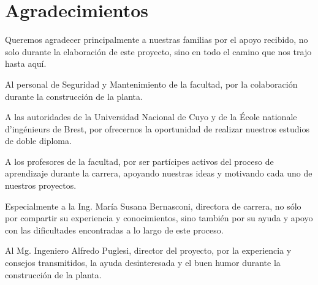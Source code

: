  \markboth{}{}
\pagestyle{empty}

\chapter*{Agradecimientos}

Queremos agradecer principalmente a nuestras familias por el apoyo recibido, no
solo durante la elaboración de este proyecto, sino en todo el camino que nos
trajo hasta aquí.

Al personal de Seguridad y Mantenimiento de la facultad, por la
colaboración durante la construcción de la planta.

A las autoridades de la Universidad Nacional de Cuyo y de la École nationale
d'ingénieurs de Brest, por ofrecernos la oportunidad de realizar nuestros
estudios de doble diploma.

A los profesores de la facultad, por ser partícipes activos del proceso de
aprendizaje durante la carrera, apoyando nuestras ideas y motivando
cada uno de nuestros proyectos.

Especialmente a la Ing. María Susana Bernasconi, directora de carrera, no sólo
por compartir su experiencia y conocimientos, sino también por su ayuda y apoyo
con las dificultades encontradas a lo largo de este proceso.

Al Mg. Ingeniero Alfredo Puglesi, director del proyecto, por la experiencia y
consejos transmitidos, la ayuda desinteresada y el buen humor durante la
construcción de la planta.
